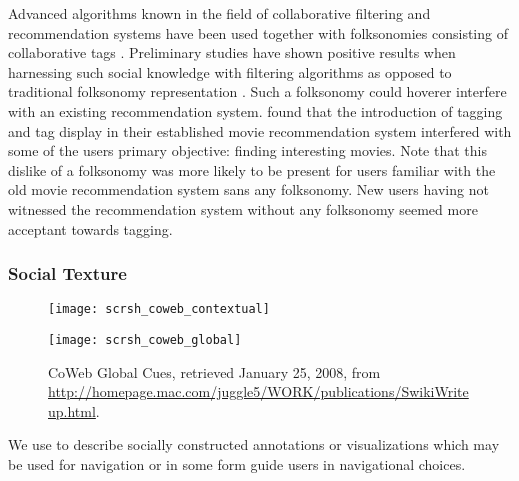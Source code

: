 Advanced algorithms known in the field of collaborative filtering
and recommendation systems have been used together with folksonomies
consisting of collaborative tags
\citep[]{wu06}. Preliminary studies have shown positive
results when harnessing such social knowledge with filtering algorithms
as opposed to traditional folksonomy representation
\citep[]{wu06}. Such a folksonomy could hoverer interfere with an
existing recommendation system. \citet[]{sen06} found that the
introduction of tagging and tag display in their established
movie recommendation system interfered with some of the users primary
objective: finding interesting movies. Note that this dislike of a
folksonomy was more likely to be present for users familiar with the old
movie recommendation system sans any folksonomy. New users having not
witnessed the recommendation system without any folksonomy seemed more
acceptant towards tagging.

\subsubsection{Social Texture}

\begin{figure}
  \captionstyle{\raggedright}
  \begin{whole}
    \begin{minipage}[t]{0.475\wholewidth}
      \texttt{[image: scrsh\_coweb\_contextual]}
      \caption[CoWeb Contextual Cues]{%
        CoWeb Contextual Cues,
        retrieved January 25, 2008, from
        \url{http://homepage.mac.com/juggle5/WORK/publications/SwikiWriteup.html}.
      }
      \label{figure:scrsh.coweb.contextual}
    \end{minipage}
    \hfill
    \begin{minipage}[t]{0.475\wholewidth}
      \texttt{[image: scrsh\_coweb\_global]}
      \caption[CoWeb Global Cues]{%
        CoWeb Global Cues,
        retrieved January 25, 2008, from
        \url{http://homepage.mac.com/juggle5/WORK/publications/SwikiWriteup.html}.
      }
      \label{figure:scrsh.coweb.global}
    \end{minipage}
  \end{whole}
  \normalcaption
\end{figure}

We use  to describe socially constructed annotations or
visualizations which may be used for navigation or in some form guide
users in navigational choices.

